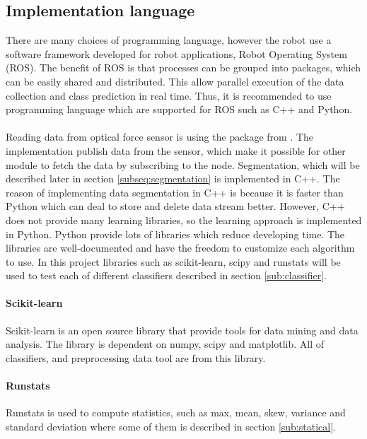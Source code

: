 \documentclass[USenglish]{ifimaster}  %
\begin{document}
\subsection{Implementation language}
There are many choices of programming language, however the robot use a software framework developed for robot applications, Robot Operating System (ROS). The benefit of ROS is that processes can be grouped into packages, which can be easily shared and distributed. This allow parallel execution of the data collection and class prediction in real time. Thus, it is recommended to use programming language which are supported for ROS such as C++ and Python. 
\\
\\
Reading data from optical force sensor is using the package from \cite{optoRos}. The implementation publish data from the sensor, which make it possible for other module to fetch the data by subscribing to the node. Segmentation, which will be described later in section \ref{subseq:segmentation} is implemented in C++. The reason of implementing data segmentation in C++ is because it is faster than Python which can deal to store and delete data stream better. However, C++ does not provide many learning libraries, so the learning approach is implemented in Python. Python provide lots of libraries which reduce developing time. The libraries are well-documented and have the freedom to customize each algorithm to use. In this project libraries such as scikit-learn, scipy and runstats will be used to test each of different classifiers described in section \ref{sub:classifier}.
	
\paragraph{Scikit-learn}
Scikit-learn \cite{scikit-learn} is an open source library that provide tools for data mining and data analysis. The library is dependent on numpy, scipy and matplotlib. All of classifiers, and preprocessing data tool are from this library. 
	
\paragraph{Runstats}
Runstats \cite{runstats} is used to compute statistics, such as max, mean, skew, variance and standard deviation where some of them is described in section \ref{sub:statical}.
	
	
\end{document}
